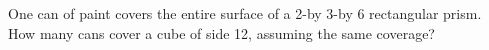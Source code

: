 One can of paint covers the entire surface of a 2-by 3-by 6 rectangular prism. How many cans cover a cube of side 12, assuming the same coverage?
